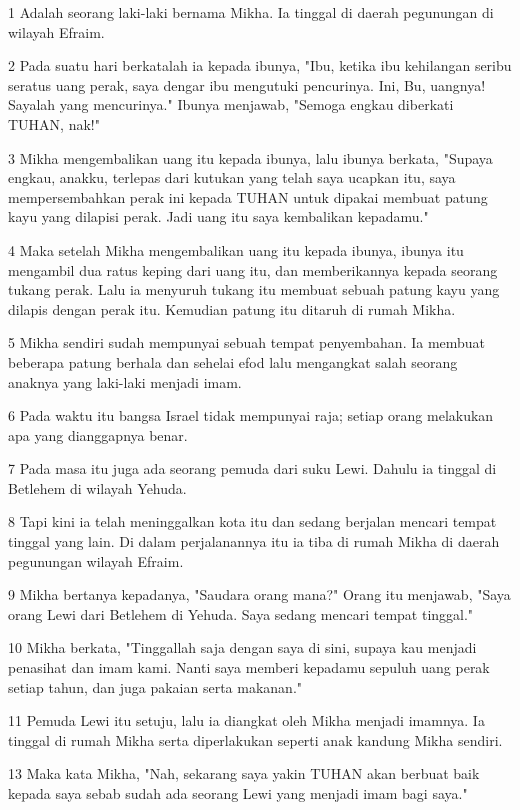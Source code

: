 \par 1 Adalah seorang laki-laki bernama Mikha. Ia tinggal di daerah pegunungan di wilayah Efraim.
\par 2 Pada suatu hari berkatalah ia kepada ibunya, "Ibu, ketika ibu kehilangan seribu seratus uang perak, saya dengar ibu mengutuki pencurinya. Ini, Bu, uangnya! Sayalah yang mencurinya." Ibunya menjawab, "Semoga engkau diberkati TUHAN, nak!"
\par 3 Mikha mengembalikan uang itu kepada ibunya, lalu ibunya berkata, "Supaya engkau, anakku, terlepas dari kutukan yang telah saya ucapkan itu, saya mempersembahkan perak ini kepada TUHAN untuk dipakai membuat patung kayu yang dilapisi perak. Jadi uang itu saya kembalikan kepadamu."
\par 4 Maka setelah Mikha mengembalikan uang itu kepada ibunya, ibunya itu mengambil dua ratus keping dari uang itu, dan memberikannya kepada seorang tukang perak. Lalu ia menyuruh tukang itu membuat sebuah patung kayu yang dilapis dengan perak itu. Kemudian patung itu ditaruh di rumah Mikha.
\par 5 Mikha sendiri sudah mempunyai sebuah tempat penyembahan. Ia membuat beberapa patung berhala dan sehelai efod lalu mengangkat salah seorang anaknya yang laki-laki menjadi imam.
\par 6 Pada waktu itu bangsa Israel tidak mempunyai raja; setiap orang melakukan apa yang dianggapnya benar.
\par 7 Pada masa itu juga ada seorang pemuda dari suku Lewi. Dahulu ia tinggal di Betlehem di wilayah Yehuda.
\par 8 Tapi kini ia telah meninggalkan kota itu dan sedang berjalan mencari tempat tinggal yang lain. Di dalam perjalanannya itu ia tiba di rumah Mikha di daerah pegunungan wilayah Efraim.
\par 9 Mikha bertanya kepadanya, "Saudara orang mana?" Orang itu menjawab, "Saya orang Lewi dari Betlehem di Yehuda. Saya sedang mencari tempat tinggal."
\par 10 Mikha berkata, "Tinggallah saja dengan saya di sini, supaya kau menjadi penasihat dan imam kami. Nanti saya memberi kepadamu sepuluh uang perak setiap tahun, dan juga pakaian serta makanan."
\par 11 Pemuda Lewi itu setuju, lalu ia diangkat oleh Mikha menjadi imamnya. Ia tinggal di rumah Mikha serta diperlakukan seperti anak kandung Mikha sendiri.
\par 13 Maka kata Mikha, "Nah, sekarang saya yakin TUHAN akan berbuat baik kepada saya sebab sudah ada seorang Lewi yang menjadi imam bagi saya."


